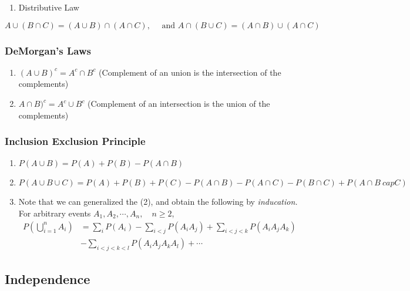 \documentclass[
]{book}
\providecommand{\tightlist}{%
  \setlength{\itemsep}{0pt}\setlength{\parskip}{0pt}}
\theoremstyle{definition}
\theoremstyle{definition}
\theoremstyle{definition}
\theoremstyle{definition}
\theoremstyle{remark}
\begin{document}
\begin{enumerate}
\def\labelenumi{\arabic{enumi}.}
\setcounter{enumi}{2}
\tightlist
\item
  Distributive Law
\end{enumerate}

\[
  A\cup (B\cap C) = (A \cup B) \cap (A \cap  C) , \quad \text{ and } A \cap (B\cup C) =  (A\cap B) \cup (A\cap C)
\]

\hypertarget{demorgans-laws}{%
\subsubsection{DeMorgan's Laws}\label{demorgans-laws}}

\begin{enumerate}
\def\labelenumi{\arabic{enumi}.}
\item
  \((A\cup B)^c = A^c \cap B^c\) (Complement of an union is the intersection of the complements)
\item
  \(A\cap B)^c = A^c \cup B^c\) (Complement of an intersection is the union of the complements)
\end{enumerate}

\hypertarget{inclusion-exclusion-principle}{%
\subsubsection{Inclusion Exclusion Principle}\label{inclusion-exclusion-principle}}

\begin{enumerate}
\def\labelenumi{\arabic{enumi}.}
\item
  \(P(A\cup B ) = P(A) + P(B) - P(A\cap B)\)
\item
  \(P(A\cup B \cup C) = P(A) + P(B) + P(C) - P(A\cap B) - P(A \cap C) - P(B \cap C) + P(A\cap B \ cap C)\)
\item
  Note that we can generalized the (2), and obtain the following by \emph{inducation.} For arbitrary events \(A_1,A_2,\cdots,A_n,\quad n\ge 2\),
  \begin{align*}
  P(\bigcup_{i=1}^n A_i)  &  =\sum_{i}P(A_{i}%
  )-\sum_{i<j}P(A_{i}A_{j})+\sum_{i<j<k}P(A_{i}A_{j}A_{k})\\
  &  -\sum_{i<j<k<l}P(A_{i}A_{j}A_{k}A_{l})+\cdots
  \end{align*}
\end{enumerate}

\hypertarget{independence}{%
\subsection{Independence}\label{independence}}
\end{document}
